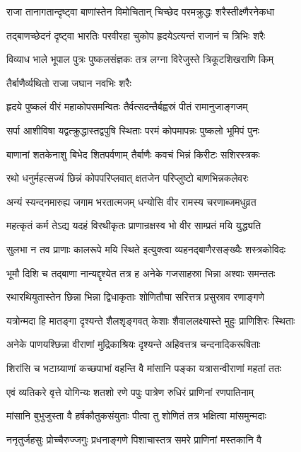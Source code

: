 \twolineshloka
{राजा तानागतान्दृष्ट्वा बाणांस्तेन विमोचितान्}
{चिच्छेद परमक्रुद्धः शरैस्तीक्ष्णैरनेकधा}%

\twolineshloka
{तद्बाणच्छेदनं दृष्ट्वा भारतिः परवीरहा}
{चुकोप हृदयेऽत्यन्तं राजानं च त्रिभिः शरैः}%

\twolineshloka
{विव्याध भाले भूपाल पुत्रः पुष्कलसंज्ञकः}
{तत्र लग्ना विरेजुस्ते त्रिकूटशिखराणि किम्}%

तैर्बाणैर्व्यथितो राजा जघान नवभिः शरैः

\twolineshloka
{हृदये पुष्कलं वीरं महाकोपसमन्वितः}
{तैर्वत्सदन्तैर्बह्वस्रं पीतं रामानुजाङ्गजम्}%

\twolineshloka
{सर्पा आशीविषा यद्वत्क्रुद्धास्तद्वपुषि स्थिताः}
{परमं कोपमापन्नः पुष्कलो भूमिपं पुनः}%

\twolineshloka
{बाणानां शतकेनाशु बिभेद शितपर्वणाम्}
{तैर्बाणैः कवचं भिन्नं किरीटः सशिरस्त्रकः}%

\twolineshloka
{रथो धनुर्महत्सज्यं छिन्नं कोपपरिप्लवात्}
{क्षतजेन परिप्लुष्टो बाणभिन्नकलेवरः}%

\twolineshloka
{अन्यं स्यन्दनमारुह्य जगाम भरतात्मजम्}
{धन्योसि वीर रामस्य चरणाब्जमधुव्रत}%

\twolineshloka
{महत्कृतं कर्म तेऽद्य यदहं विरथीकृतः}
{प्राणान्रक्षस्व भो वीर साम्प्रतं मयि युद्ध्यति}%

\twolineshloka
{सुलभा न तव प्राणाः कालरूपे मयि स्थिते}
{इत्युक्त्वा व्यहनद्बाणैरसङ्ख्यैः शस्त्रकोविदः}%

\twolineshloka
{भूमौ दिशि च तद्बाणा नान्यद्दृश्येत तत्र ह}
{अनेके गजसाहस्रा भिन्ना अश्वाः समन्ततः}%

\twolineshloka
{रथारथियुतास्तेन छिन्ना भिन्ना द्विधाकृताः}
{शोणितौघा सरित्तत्र प्रसुस्राव रणाङ्गणे}%

\twolineshloka
{यत्रोन्मदा हि मातङ्गा दृश्यन्ते शैलशृङ्गवत्}
{केशाः शैवाललक्ष्यास्ते मुहुः प्राणिशिरः स्थिताः}%

\twolineshloka
{अनेके पाणयश्छिन्ना वीराणां मुद्रिकाश्रियः}
{दृश्यन्ते अहिवत्तत्र चन्दनादिकरूषिताः}%

\twolineshloka
{शिरांसि च भटाग्र्याणां कच्छपाभां वहन्ति वै}
{मांसानि पङ्का यत्रासन्वीराणां महतां ततः}%

\twolineshloka
{एवं व्यतिकरे वृत्ते योगिन्यः शतशो रणे}
{पपुः पात्रेण रुधिरं प्राणिनां रणपातिनाम्}%

\twolineshloka
{मांसानि बुभुजुस्ता वै हर्षकौतुकसंयुताः}
{पीत्वा तु शोणितं तत्र भक्षित्वा मांसमुन्मदाः}%

\twolineshloka
{ननृतुर्जहसुः प्रोच्चैरुज्जगुः प्रधनाङ्गणे}
{पिशाचास्तत्र समरे प्राणिनां मस्तकानि वै}%

